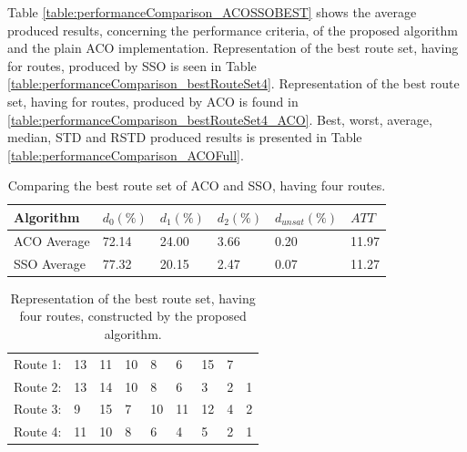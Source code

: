 Table \vref{table:performanceComparison_ACOSSOBEST} shows the average produced results, concerning the performance criteria, of the proposed algorithm and the plain ACO implementation. Representation of the best route set, having for routes, produced by SSO is seen in Table \vref{table:performanceComparison_bestRouteSet4}.  Representation of the best route set, having for routes, produced by ACO is found in \vref{table:performanceComparison_bestRouteSet4_ACO}. Best, worst, average, median, STD and RSTD produced results is presented in Table \vref{table:performanceComparison_ACOFull}.

    \begin{table}[H]
    \centering
    \begin{tabular}{|l||l|l|l|l|l|}
    \hline
    Algorithm & $d_0(\%)$ & $d_1(\%)$ & $d_2(\%)$ & $d_{unsat}(\%)$ & $ATT$ \\
    \hline
    ACO Average & 72.14 & 24.00 & 3.66 & 0.20 & 11.97 \\
    \hline
    SSO Average & 77.32 & 20.15 & 2.47 & 0.07 & 11.27 \\
    \hline
    \end{tabular}
    \caption {Comparing the best route set of ACO and SSO, having four routes.}
    
    \label{table:performanceComparison_ACOSSOBEST}
    \end{table}

   

\begin{table}[H]
    \centering
    \begin{tabular}{|l|llllllll|}
    \hline
    Route 1: & 13 & 11 & 10 & 8 & 6 & 15 & 7 &  \\
    Route 2: & 13 & 14 & 10 & 8 & 6 & 3 & 2 & 1 \\
    Route 3: & 9 & 15 & 7 & 10 & 11 & 12 & 4 & 2 \\
    Route 4: & 11 & 10 & 8 & 6 & 4 & 5 & 2 & 1 \\
	\hline
    \end{tabular}
    \caption {Representation of the best route set, having four routes, constructed by the proposed algorithm.}
    \label{table:performanceComparison_bestRouteSet4}
\end{table}

